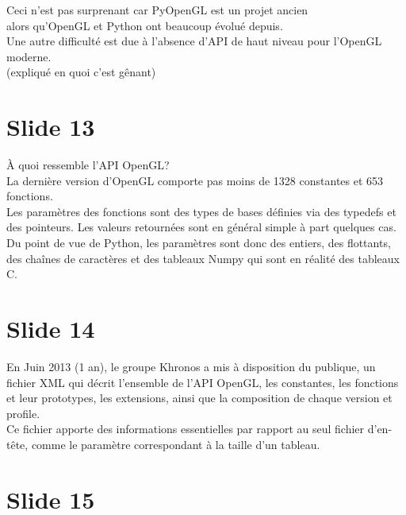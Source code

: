 \documentclass[12pt]{article}
\begin{document}
\noindent%
Ceci n'est pas surprenant car PyOpenGL est un projet ancien \\
alors qu'OpenGL et Python ont beaucoup évolué depuis. \\

\noindent%
Une autre difficulté est due à l'absence d'API de haut niveau pour l'OpenGL moderne. \\
(expliqué en quoi c'est gênant) \\

\section{Slide 13}

\noindent%
À quoi ressemble l'API OpenGL? \\

\noindent%
La dernière version d'OpenGL comporte pas moins de 1328 constantes et 653 fonctions. \\

\noindent%
Les paramètres des fonctions sont des types de bases définies via des typedefs et des
pointeurs. Les valeurs retournées sont en général simple à part quelques cas. \\

\noindent%
Du point de vue de Python, les paramètres sont donc des entiers, des flottants, des chaînes de
caractères et des tableaux Numpy qui sont en réalité des tableaux C. %


\section{Slide 14}

\noindent%
En Juin 2013 (1 an), le groupe Khronos a mis à disposition du publique, un fichier XML qui décrit
l'ensemble de l'API OpenGL, les constantes, les fonctions et leur prototypes, les extensions, ainsi
que la composition de chaque version et profile. \\ %

\noindent%
Ce fichier apporte des informations essentielles par rapport au seul fichier d'en-tête, comme le
paramètre correspondant à la taille d'un tableau.

\section{Slide 15}
\end{document}
